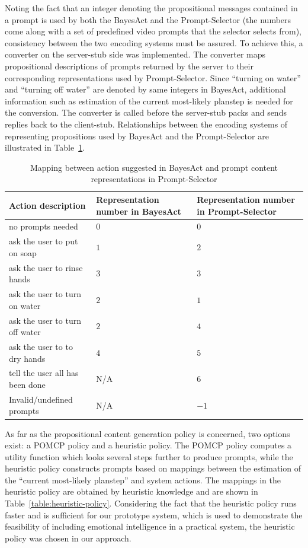 Noting the fact that an integer denoting the propositional messages contained in a prompt is used by both the BayesAct and the Prompt-Selector (the numbers come along with a set of predefined video prompts that the selector selects from), consistency between the two encoding systems must be assured. To achieve this, a converter on the server-stub side was implemented. The converter maps propositional descriptions of prompts returned by the server to their corresponding representations used by Prompt-Selector. Since ``turning on water'' and ``turning off water'' are denoted by same integers in BayesAct, additional information such as estimation of the current most-likely planstep is needed for the conversion. The converter is called before the server-stub packs and sends replies back to the client-stub. Relationships between the encoding systems of representing propositions used by BayesAct and the Prompt-Selector are illustrated in Table~\ref{table:prompt-number-def}.

%
\begin{table}
\centering
\caption{Mapping between action suggested in BayesAct and prompt content representations in Prompt-Selector}
\label{table:prompt-number-def}
\begin{tabular}{| l | p{4.5cm} | p{4.5cm} |}
\hline
Action description & Representation number in BayesAct & Representation number in Prompt-Selector \\ \hline
no prompts needed & 0 & 0\\ \hline
ask the user to put on soap & $1$ & $2$ \\ \hline
ask the user to rinse hands & $3$ & $3$ \\ \hline
ask the user to turn on water & $2$ & $1$ \\ \hline
ask the user to turn off water & $2$ & $4$ \\ \hline
ask the user to to dry hands & $4$ & $5$ \\ \hline
tell the user all has been done & N/A & $6$ \\ \hline
Invalid/undefined prompts & N/A &$-1$ \\ \hline
\end{tabular}
\end{table}

As far as the propositional content generation policy is concerned, two options exist: a POMCP policy and a heuristic policy. The POMCP policy computes a utility function which looks several steps further to produce prompts, while the heuristic policy constructs prompts based on mappings between the estimation of the ``current most-likely  planstep'' and system actions. The mappings in the heuristic policy are obtained by heuristic knowledge and are shown in Table~\ref{table:heuristic-policy}. Considering the fact that the heuristic policy runs faster and is sufficient for our prototype system, which is used to demonstrate the feasibility of including emotional intelligence in a practical system, the heuristic policy was chosen in our approach.

